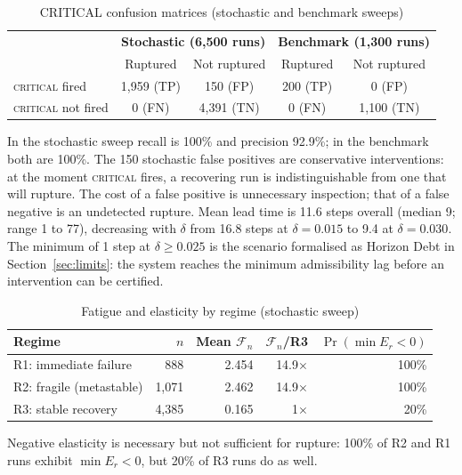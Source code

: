 \documentclass{llncs}
\newcommand{\st}[1]{\textup{\textsc{#1}}}
\begin{document}
\begin{table}[tbp]
\centering
\caption{CRITICAL confusion matrices (stochastic and benchmark sweeps)}
\label{tab:conf-stoch}
\small
\begin{tabular}{lcc@{\hspace{2em}}cc}
\toprule
 & \multicolumn{2}{c}{\textbf{Stochastic (6,500 runs)}}
 & \multicolumn{2}{c}{\textbf{Benchmark (1,300 runs)}} \\
 & Ruptured & Not ruptured & Ruptured & Not ruptured \\
\midrule
\st{critical} fired     & 1,959 (TP) & 150 (FP) &  200 (TP) &     0 (FP) \\
\st{critical} not fired &     0 (FN) & 4,391 (TN) &    0 (FN) & 1,100 (TN) \\
\bottomrule
\end{tabular}
\end{table}

In the stochastic sweep recall is 100\% and precision 92.9\%; in the
benchmark both are 100\%. The 150 stochastic false positives are
conservative interventions: at the moment \st{critical} fires, a
recovering run is indistinguishable from one that will rupture. The
cost of a false positive is unnecessary inspection; that of a false
negative is an undetected rupture. Mean lead time is 11.6 steps overall
(median 9; range 1 to 77), decreasing with $\delta$ from 16.8 steps at
$\delta = 0.015$ to 9.4 at $\delta = 0.030$. The minimum of 1 step at $\delta \geq 0.025$ is the scenario formalised as Horizon Debt in Section~\ref{sec:limits}: the system reaches the minimum admissibility lag before an intervention can be certified.

\begin{table}[tbp]
\centering
\caption{Fatigue and elasticity by regime (stochastic sweep)}
\label{tab:fatigue}
\small
\begin{tabular}{lrrrr}
\toprule
Regime & $n$ & Mean $\mathcal{F}_n$ & $\mathcal{F}_n$/R3 & $\Pr(\min E_r < 0)$ \\
\midrule
R1: immediate failure    &   888 & 2.454 & 14.9$\times$ & 100\% \\
R2: fragile (metastable) & 1,071 & 2.462 & 14.9$\times$ & 100\% \\
R3: stable recovery      & 4,385 & 0.165 & 1$\times$    &  20\% \\
\bottomrule
\end{tabular}
\end{table}

\begin{observation}
Negative elasticity is necessary but not sufficient for rupture: 100\%
of R2 and R1 runs exhibit $\min E_r < 0$, but 20\% of R3 runs do as well.
\end{observation}
\end{document}
